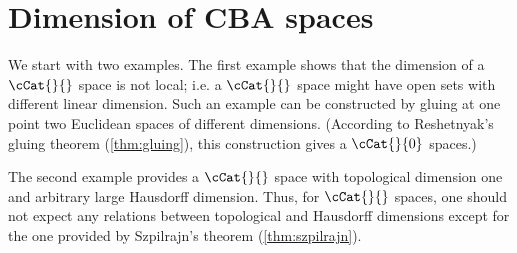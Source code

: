\begin{comment}
\parit{Proof 2.}
According to \ref{LinDim+-f}, there is a point $p\in\spc{L}$, such that $\T_p\iso\RR$;
i.e., $\Sigma_p$ consists of two directions $\xi_+$, $\xi_-$ on angle $\pi$.
Both of directions $\xi_+$, $\xi_-$ have to be geodesic;
otherwise the set of geodesic directions $\Sigma_p'$ would not be dense in $\Sigma_p$.
Let $\gamma_+$ and $\gamma_-$ be maximal geodesics in directions $\xi_+$ and $\xi_-$ correspondingly.

The geodesics $\gamma_+$ and $\gamma_-$ cover $\spc{L}$ completely;
that follows sinse $\spc{L}$ is geodesic (\ref{cor:dim>proper}) and since geodesics in $\spc{L}$ do not bifurcate (\ref{thm:g-split}).
It is easy to see that only following cases can occur
\begin{itemize}
\item both $\gamma_+$ and $\gamma_-$ are defined on $[0,\infty)$.
In this case $\spc{L}\iso\RR$.
\item $\gamma_+$ is defined on closed interval, say $[0,a]$ and $\gamma_-$ is defined of an infinite interval $[0,\infty)$ (or vise versa).
In this case $\spc{L}\iso\RR_{\ge0}$.
\item both $\gamma_+$ and $\gamma_-$ are defined on closed intervals, say $[0,a]$ and $[0,b]$ and $\gamma_+(a)\not=\gamma_-(b)$.
In this case $\spc{L}\iso[0,a+b]$.
\item both $\gamma_+$ and $\gamma_-$ are defined on one closed interval, say $[0,a]$ and $\gamma_+(a)=\gamma_-(a)$.
In this case, $\spc{L}\iso\tfrac{a}{\pi}\blow\SS^1$.
\end{itemize}
Hence the result.\qeds
\end{comment}





\section{Dimension of CBA spaces}\label{sec:dim-cba}

We start with two examples.
The first example shows that the dimension of a $\cCat{}{}$ space is not local;
i.e. a $\cCat{}{}$ space might have open sets with different linear dimension.
Such an example can be constructed by gluing at one point two Euclidean spaces of different dimensions.
(According to Reshetnyak's gluing theorem (\ref{thm:gluing}), this construction gives a $\cCat{}{0}$ spaces.)

The second example provides a $\cCat{}{}$ space 
with topological dimension one and arbitrary large Hausdorff dimension.
Thus, for $\cCat{}{}$ spaces, one should not expect any relations between topological and Hausdorff dimensions except for the one provided by Szpilrajn's theorem (\ref{thm:szpilrajn}).

